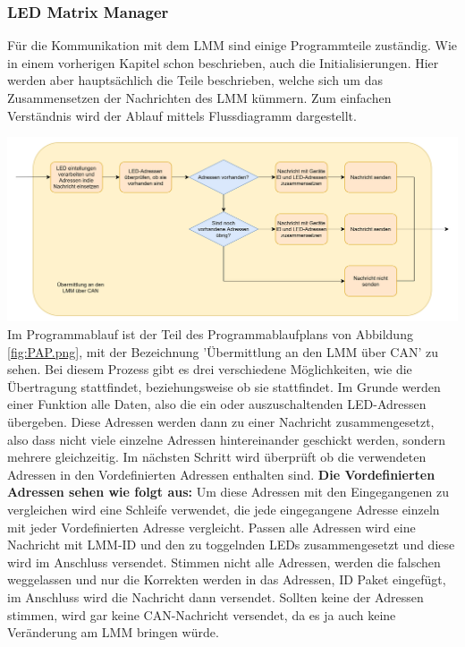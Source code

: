 \documentclass[paper=a4, 12pt]{scrreprt}
\begin{document}
			\subsubsection{LED Matrix Manager} \hfill \break
			Für die Kommunikation mit dem LMM sind einige Programmteile zuständig. Wie in einem vorherigen Kapitel schon beschrieben, auch die Initialisierungen. Hier werden aber hauptsächlich die Teile beschrieben, welche sich um das Zusammensetzen der Nachrichten des LMM kümmern. Zum einfachen Verständnis wird der Ablauf mittels Flussdiagramm dargestellt. \hfill \break
			\begin{adjustbox}{center,caption={Programmablauf LMM},label={fig:PABL-LMM},nofloat=figure,vspace=\bigskipamount}
				\includegraphics[width=\textwidth]{img/Programmablauf-LMM.png}
			\end{adjustbox} \hfill \break
			Im Programmablauf ist der Teil des Programmablaufplans von Abbildung \ref{fig:PAP.png}, mit der Bezeichnung 'Übermittlung an den LMM über CAN' zu sehen. Bei diesem Prozess gibt es drei verschiedene Möglichkeiten, wie die Übertragung stattfindet, beziehungsweise ob sie stattfindet. Im Grunde werden einer Funktion alle Daten, also die ein oder auszuschaltenden LED-Adressen übergeben. Diese Adressen werden dann zu einer Nachricht zusammengesetzt, also dass nicht viele einzelne Adressen hintereinander geschickt werden, sondern mehrere gleichzeitig. Im nächsten Schritt wird überprüft ob die verwendeten Adressen in den Vordefinierten Adressen enthalten sind. \hfill \break \newpage
			\textbf{Die Vordefinierten Adressen sehen wie folgt aus:} \hfill \break
			 \hfill \break
			Um diese Adressen mit den Eingegangenen zu vergleichen wird eine Schleife verwendet, die jede eingegangene Adresse einzeln mit jeder Vordefinierten Adresse vergleicht. Passen alle Adressen wird eine Nachricht mit LMM-ID und den zu toggelnden LEDs zusammengesetzt und diese wird im Anschluss versendet. \hfill \break \hfill \break
			Stimmen nicht alle Adressen, werden die falschen weggelassen und nur die Korrekten werden in das Adressen, ID Paket eingefügt, im Anschluss wird die Nachricht dann versendet. \hfill \break \hfill \break
			Sollten keine der Adressen stimmen, wird gar keine CAN-Nachricht versendet, da es ja auch keine Veränderung am LMM bringen würde.
			\newpage
			
\end{document}
